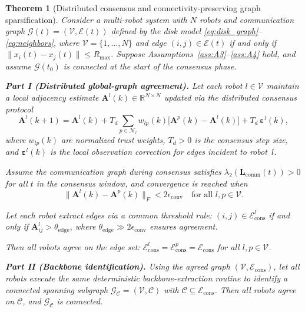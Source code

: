 \documentclass[conference]{IEEEconf}
\theoremstyle{plain}
\newtheorem{theorem}{Theorem} %
\begin{document}
\begin{theorem}[Distributed consensus and connectivity-preserving graph sparsification]
\label{thm:distributed-connectivity}
Consider a multi-robot system with $N$ robots and communication graph $\mathcal{G}(t)=(\mathcal{V},\mathcal{E}(t))$ defined by the disk model \eqref{eq:disk_graph}--\eqref{eq:neighbors}, where $\mathcal{V}=\{1,\ldots,N\}$ and edge $(i,j)\in\mathcal{E}(t)$ if and only if $\|x_i(t)-x_j(t)\|\le R_{\max}$.
Suppose Assumptions~\ref{ass:A3}--\ref{ass:A4} hold, and assume $\mathcal{G}(t_0)$ is connected at the start of the consensus phase.

\medskip
\noindent\textbf{Part I (Distributed global-graph agreement).}
Let each robot $l\in\mathcal{V}$ maintain a local adjacency estimate $\mathbf{A}^l(k)\in\mathbb{R}^{N\times N}$ updated via the distributed consensus protocol
\begin{equation}
\mathbf{A}^l(k+1) = \mathbf{A}^l(k) + T_d\sum_{p\in\mathcal{N}_l} w_{lp}(k)\bigl[\mathbf{A}^p(k)-\mathbf{A}^l(k)\bigr] + T_d\,\boldsymbol{\varepsilon}^l(k),
\label{eq:consensus-update-thm}
\end{equation}
where $w_{lp}(k)$ are normalized trust weights, $T_d>0$ is the consensus step size, and $\boldsymbol{\varepsilon}^l(k)$ is the local observation correction for edges incident to robot~$l$.

Assume the communication graph during consensus satisfies $\lambda_2(\mathbf{L}_{\mathrm{comm}}(t))>0$ for all $t$ in the consensus window, and convergence is reached when
\begin{equation}
\|\mathbf{A}^l(k)-\mathbf{A}^p(k)\|_F < 2\epsilon_{\mathrm{conv}} \quad\text{for all }l,p\in\mathcal{V}.
\label{eq:consensus-convergence-thm}
\end{equation}

Let each robot extract edges via a common threshold rule: $(i,j)\in\mathcal{E}^l_{\mathrm{cons}}$ if and only if $\mathbf{A}^l_{ij}>\theta_{\mathrm{edge}}$, where $\theta_{\mathrm{edge}}\gg 2\epsilon_{\mathrm{conv}}$ ensures agreement.

Then all robots agree on the edge set: $\mathcal{E}^l_{\mathrm{cons}}=\mathcal{E}^p_{\mathrm{cons}}=\mathcal{E}_{\mathrm{cons}}$ for all $l,p\in\mathcal{V}$.

\medskip
\noindent\textbf{Part II (Backbone identification).}
Using the agreed graph $(\mathcal{V},\mathcal{E}_{\mathrm{cons}})$, let all robots execute the same deterministic backbone-extraction routine to identify a connected spanning subgraph $\mathcal{G}_{\mathcal{C}}=(\mathcal{V},\mathcal{C})$ with $\mathcal{C}\subseteq\mathcal{E}_{\mathrm{cons}}$.
Then all robots agree on $\mathcal{C}$, and $\mathcal{G}_{\mathcal{C}}$ is connected.


\end{theorem}
\end{document}
